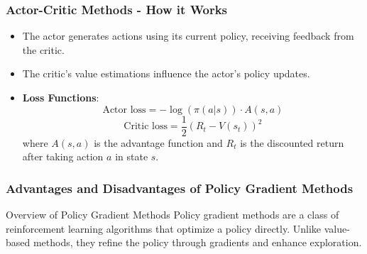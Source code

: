 \documentclass{beamer}
\begin{document}
\begin{frame}[fragile]
    \frametitle{Actor-Critic Methods - How it Works}
    \begin{itemize}
        \item The actor generates actions using its current policy, receiving feedback from the critic.
        \item The critic's value estimations influence the actor's policy updates.
        \item \textbf{Loss Functions}:
        \begin{equation}
            \text{Actor loss} = -\log(\pi(a|s)) \cdot A(s, a)
        \end{equation}
        \begin{equation}
            \text{Critic loss} = \frac{1}{2}(R_t - V(s_t))^2
        \end{equation}
        where $A(s, a)$ is the advantage function and $R_t$ is the discounted return after taking action $a$ in state $s$.
    \end{itemize}
\end{frame}

\begin{frame}[fragile]
    \frametitle{Advantages and Disadvantages of Policy Gradient Methods}
    \begin{block}{Overview of Policy Gradient Methods}
        Policy gradient methods are a class of reinforcement learning algorithms that optimize a policy directly. Unlike value-based methods, they refine the policy through gradients and enhance exploration.
    \end{block}
\end{frame}
\end{document}
